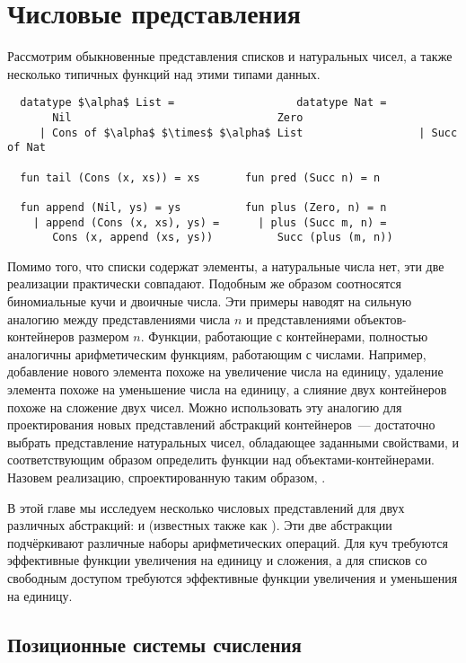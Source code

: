 \chapter{Числовые представления}
\label{ch:9}

Рассмотрим обыкновенные представления списков и натуральных чисел, а
также несколько типичных функций над этими типами данных.
\begin{lstlisting}
  datatype $\alpha$ List =                   datatype Nat =
       Nil                                Zero
     | Cons of $\alpha$ $\times$ $\alpha$ List                  | Succ of Nat

  fun tail (Cons (x, xs)) = xs       fun pred (Succ n) = n

  fun append (Nil, ys) = ys          fun plus (Zero, n) = n
    | append (Cons (x, xs), ys) =      | plus (Succ m, n) =
       Cons (x, append (xs, ys))          Succ (plus (m, n))
\end{lstlisting}
Помимо того, что списки содержат элементы, а натуральные числа нет,
эти две реализации практически совпадают. Подобным же образом
соотносятся биномиальные кучи и двоичные числа. Эти примеры наводят на
сильную аналогию между представлениями числа $n$ и представлениями
объектов-контейнеров размером $n$. Функции, работающие с контейнерами,
полностью аналогичны арифметическим функциям, работающим с
числами. Например, добавление нового элемента похоже на увеличение
числа на единицу, удаление элемента похоже на уменьшение числа на
единицу, а слияние двух контейнеров похоже на сложение двух
чисел. Можно использовать эту аналогию для проектирования новых
представлений абстракций контейнеров~--- достаточно выбрать
представление натуральных чисел, обладающее заданными свойствами, и
соответствующим образом определить функции над
объектами-контейнерами. Назовем реализацию, спроектированную таким
образом, .

В этой главе мы исследуем несколько числовых представлений для двух
различных абстракций:  и  (известных также как ). Эти две абстракции подчёркивают различные наборы
арифметических операций. Для куч требуются эффективные функции
увеличения на единицу и сложения, а для списков со свободным доступом
требуются эффективные функции увеличения и уменьшения на единицу.

\section{Позиционные системы счисления}
\label{sc:9.1}

